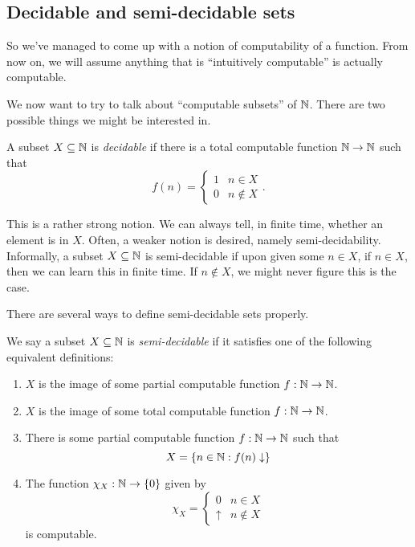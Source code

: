 \documentclass[a4paper]{article}
\begin{document}
\subsection{Decidable and semi-decidable sets}
So we've managed to come up with a notion of computability of a function. From now on, we will assume anything that is ``intuitively computable'' is actually computable.

We now want to try to talk about ``computable subsets'' of $\mathbb{N}$. There are two possible things we might be interested in.
\begin{defi}
  A subset $X \subseteq \mathbb{N}$ is \emph{decidable} if there is a total computable function $\mathbb{N} \to \mathbb{N}$ such that
  \[
    f(n) =
    \begin{cases}
      1 & n \in X\\
      0 & n \not \in X
    \end{cases}.
  \]
\end{defi}
This is a rather strong notion. We can always tell, in finite time, whether an element is in $X$. Often, a weaker notion is desired, namely semi-decidability. Informally, a subset $X \subseteq \mathbb{N}$ is semi-decidable if upon given some $n \in X$, if $n \in X$, then we can learn this in finite time. If $n \not \in X$, we might never figure this is the case.

There are several ways to define semi-decidable sets properly.
\begin{defi}
  We say a subset $X \subseteq \mathbb{N}$ is \emph{semi-decidable} if it satisfies one of the following equivalent definitions:
  \begin{enumerate}
    \item $X$ is the image of some partial computable function $f: \mathbb{N} \to \mathbb{N}$.
    \item $X$ is the image of some total computable function $f: \mathbb{N} \to \mathbb{N}$.
    \item There is some partial computable function $f: \mathbb{N} \to \mathbb{N}$ such that
      \[
        X = \{n \in \mathbb{N}: f(n) \downarrow\}
      \]
    \item The function $\chi_X: \mathbb{N} \to \{0\}$ given by
      \[
        \chi_X =
        \begin{cases}
          0 & n \in X\\
          \uparrow & n\not\in X
        \end{cases}
      \]
      is computable.
  \end{enumerate}
\end{defi}
%
\end{document}
